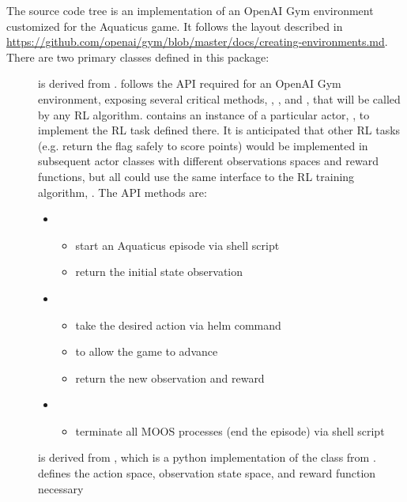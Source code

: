 \documentclass[onecolumn,letterpaper,11pt]{article}
\begin{document}
The  source code tree is an implementation of an
OpenAI Gym environment customized for the Aquaticus game. It follows
the layout described in
\url{https://github.com/openai/gym/blob/master/docs/creating-environments.md}.
There are two primary classes defined in this package:
\begin{description}
\item [] is derived from
  .  follows the API required for
  an OpenAI Gym environment, exposing several critical methods,
  , , and , that will
  be called by any RL algorithm.  contains an
  instance of a particular actor, , to
  implement the RL task defined there. It is anticipated that other
  RL tasks (e.g. return the flag safely to score points) would be
  implemented in subsequent actor classes with different 
  observations spaces and reward functions, but all could use the
  same interface to the RL training algorithm, .
  The API methods are:
  \begin{itemize}
  \item {}
    \begin{itemize}
    \item start an Aquaticus episode via shell script
    \item return the initial state observation
    \end{itemize}
  \item {}
    \begin{itemize}
    \item take the desired action via helm command
    \item {} to allow the game to advance 
    \item return the new observation and reward
    \end{itemize}
  \item {}
    \begin{itemize}
    \item terminate all MOOS processes (end the episode) via shell script
    \end{itemize}
  \end{itemize}
\item [] is derived from ,
  which is a python implementation of the 
  class from .  defines the
  action space, observation state space, and reward function necessary

\end{description}
\end{document}
